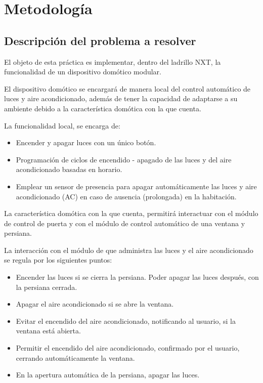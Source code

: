 \documentclass[journal]{IEEEtran}
\begin{document}
\section{Metodología}
\label{sec:metodologia}

\subsection{Descripción del problema a resolver}
\label{sub:descripcion_problema}
El objeto de esta práctica es implementar, dentro del ladrillo NXT, la funcionalidad de un dispositivo domótico modular.

El dispositivo domótico se encargará de manera local del control automático de luces y aire acondicionado, además  de tener la capacidad de adaptarse a su ambiente debido a la característica domótica con la que cuenta.

La funcionalidad local, se encarga de:
\begin{itemize}
	\item Encender y apagar luces con un único botón.
	\item Programación de ciclos de encendido - apagado de las luces y del aire acondicionado basadas en horario.
	\item Emplear un sensor de presencia para apagar automáticamente las luces y aire acondicionado (AC) en caso de ausencia (prolongada) en la habitación.
\end{itemize}

La característica domótica con la que cuenta, permitirá interactuar con el módulo de control de puerta y con el módulo de control automático de una ventana y persiana.
 
La interacción con el módulo de que administra las luces y el aire acondicionado se regula por los siguientes puntos:
\begin{itemize}
   \item Encender las luces si se cierra la persiana. 
   Poder apagar las luces después, con la persiana cerrada.
	\item Apagar el aire acondicionado si se abre la ventana.
	\item Evitar el encendido del aire acondicionado, notificando al usuario, si la ventana está abierta.
	\item Permitir el encendido del aire acondicionado, confirmado por el usuario, cerrando automáticamente la ventana.
	\item En la apertura automática de la persiana, apagar las luces.
\end{itemize} 
\end{document}
